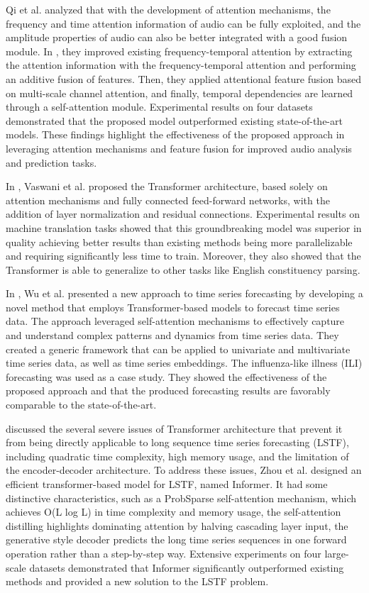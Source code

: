 Qi et al. analyzed that with the development of attention mechanisms, the frequency and time attention information of audio can be fully exploited, and the amplitude properties of audio can also be better integrated with a good fusion module.
In \cite{10019616}, they improved existing frequency-temporal attention by extracting the attention information with the frequency-temporal attention and performing an additive fusion of features.
Then, they applied attentional feature fusion based on multi-scale channel attention, and finally, temporal dependencies are learned through a self-attention module.
Experimental results on four datasets demonstrated that the proposed model outperformed existing state-of-the-art models.
These findings highlight the effectiveness of the proposed approach in leveraging attention mechanisms and feature fusion for improved audio analysis and prediction tasks.

In \cite{Vaswani2017}, Vaswani et al. proposed the Transformer architecture, based solely on attention mechanisms and fully connected feed-forward networks, with the addition of layer normalization and residual connections.
Experimental results on machine translation tasks showed that this groundbreaking model was superior in quality achieving better results than existing methods being more parallelizable and requiring significantly less time to train.
Moreover, they also showed that the Transformer is able to generalize to other tasks like English constituency parsing.

In \cite{Wu2020}, Wu et al. presented a new approach to time series forecasting by developing a novel method that employs Transformer-based models to forecast time series data.
The approach leveraged self-attention mechanisms to effectively capture and understand complex patterns and dynamics from time series data.
They created a generic framework that can be applied to univariate and multivariate time series data, as well as time series embeddings.
The influenza-like illness (ILI) forecasting was used as a case study.
They showed the effectiveness of the proposed approach and that the produced forecasting results are favorably comparable to the state-of-the-art.

\cite{Zhou2020} discussed the several severe issues of Transformer architecture that prevent it from being directly applicable to long sequence time series forecasting (LSTF), including quadratic time complexity, high memory usage, and the limitation of the encoder-decoder architecture.
To address these issues, Zhou et al. designed an efficient transformer-based model for LSTF, named Informer.
It had some distinctive characteristics, such as a ProbSparse self-attention mechanism, which achieves O(L log L) in time complexity and memory usage, the self-attention distilling highlights dominating attention by halving cascading layer input, the generative style decoder predicts the long time series sequences in one forward operation rather than a step-by-step way.
Extensive experiments on four large-scale datasets demonstrated that Informer significantly outperformed existing methods and provided a new solution to the LSTF problem.

